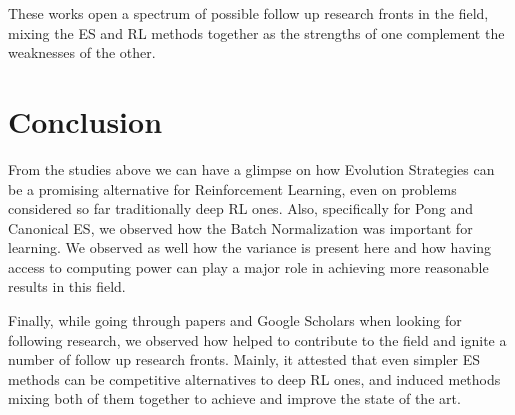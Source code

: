 \documentclass[10pt]{article} %
\begin{document}
These works open a spectrum of possible follow up research fronts in the field, mixing the ES and RL methods together as the strengths of one complement the weaknesses of the other. 

\section{Conclusion}

From the studies above we can have a glimpse on how Evolution Strategies can be a promising alternative for Reinforcement Learning, even on problems considered so far traditionally deep RL ones. Also, specifically for Pong and Canonical ES, we observed how the Batch Normalization was important for learning. We observed as well how the variance is present here and how having access to computing power can play a major role in achieving more reasonable results in this field. 

Finally, while going through papers and Google Scholars when looking for following research, we observed how \cite{back-to-basics} helped to contribute to the field and ignite a number of follow up research fronts. Mainly, it attested that even simpler ES methods can be competitive alternatives to deep RL ones, and induced methods mixing both of them together to achieve and improve the state of the art.

{}

\end{document}

